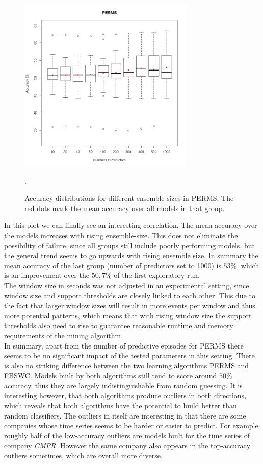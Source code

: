 \begin{figure}[h]
	\centering
  	\includegraphics[width=0.75\textwidth]{permsNumPredictors}
	\caption{Accuracy distributions for different ensemble sizes in PERMS. The red dots mark the mean accuracy over all models in that group.}.
	\label{fig_permsNumPredictors}
\end{figure}

In this plot we can finally see an interesting correlation. The mean accuracy over the models increases with rising ensemble-size. This does not eliminate the possibility of failure, since all groups still include poorly performing models, but the general trend seems to go upwards with rising ensemble size. In summary the mean accuracy of the last group (number of predictors set to 1000) is $53\%$, which is an improvement over the $50,7\%$ of the first exploratory run. \\
The window size in seconds was not adjusted in an experimental setting, since window size and support thresholds are closely linked to each other. This due to the fact that larger window sizes will result in more events per window and thus more potential patterns, which means that with rising window size the support thresholds also need to rise to guarantee reasonable runtime and memory requirements of the mining algorithm. \\
In summary, apart from the number of predictive episodes for PERMS there seems to be no significant impact of the tested parameters in this setting. There is also no striking difference between the two learning algorithms PERMS and FBSWC. Models built by both algorithms still tend to score around $50\%$ accuracy, thus they are largely indistinguishable from random guessing. It is interesting however, that both algorithms produce outliers in both directions, which reveals that both algorithms have the potential to build better than random classifiers. The outliers in itself are interesting in that there are some companies whose time series seems to be harder or easier to predict. For example roughly half of the low-accuracy outliers are models built for the time series of company \textit{CMPR}. However the same company also appears in the top-accuracy outliers sometimes, which are overall more diverse.


